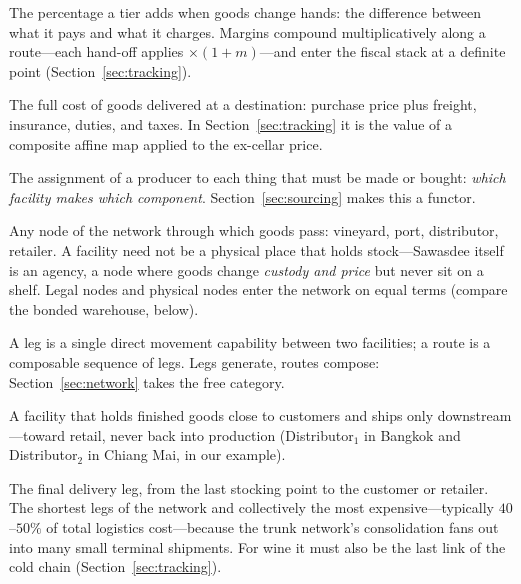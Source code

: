 \documentclass[11pt,a4paper]{article}
\theoremstyle{plain}
\theoremstyle{definition}
\theoremstyle{remark}
\begin{document}
\begin{description}[nosep]
\item[Markup / margin.] The percentage a tier adds when goods change
  hands: the difference between what it pays and what it charges.
  Margins compound multiplicatively along a route---each hand-off
  applies $\times(1+m)$---and enter the fiscal stack at a definite
  point (Section~\ref{sec:tracking}).

\item[Landed cost.] The full cost of goods delivered at a
  destination: purchase price plus freight, insurance, duties, and
  taxes. In Section~\ref{sec:tracking} it is the value of a composite
  affine map applied to the ex-cellar price.

\item[Sourcing.] The assignment of a producer to each thing that must
  be made or bought: \emph{which facility makes which component}.
  Section~\ref{sec:sourcing} makes this a functor.

\item[Facility.] Any node of the network through which goods pass:
  vineyard, port, distributor, retailer. A facility need not be a
  physical place that holds stock---Sawasdee itself is an agency,
  a node where goods change \emph{custody and price} but never
  sit on a shelf. Legal nodes and physical nodes enter the network
  on equal terms (compare the bonded warehouse, below).

\item[Shipping leg / route.] A leg is a single direct movement
  capability between two facilities; a route is a composable sequence
  of legs. Legs generate, routes compose: Section~\ref{sec:network} takes the free
  category.

\item[Distributor / distribution centre.] A facility that holds
  finished goods close to customers and ships only
  downstream---toward retail, never back into production
  (Distributor$_1$ in Bangkok and Distributor$_2$ in Chiang Mai, in
  our example).

\item[Last mile.] The final delivery leg, from the last stocking
  point to the customer or retailer. The shortest legs of the network
  and collectively the most expensive---typically $40$--$50\%$ of
  total logistics cost---because the trunk network's consolidation
  fans out into many small terminal shipments. For wine it must also
  be the last link of the cold chain
  (Section~\ref{sec:tracking}).


\end{description}
\end{document}
